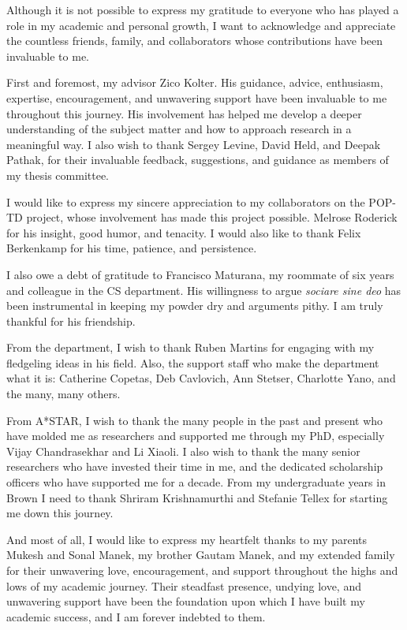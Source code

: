 \documentclass[12pt]{cmuthesis}
\begin{document}
\begin{acknowledgments}
	Although it is not possible to express my gratitude to everyone who has played a role in my academic and personal growth, I want to acknowledge and appreciate the countless friends, family, and collaborators whose contributions have been invaluable to me.

	First and foremost, my advisor Zico Kolter. His guidance, advice, enthusiasm, expertise, encouragement, and unwavering support have been invaluable to me throughout this journey. His involvement has helped me develop a deeper understanding of the subject matter and how to approach research in a meaningful way. I also wish to thank Sergey Levine, David Held, and Deepak Pathak, for their invaluable feedback, suggestions, and guidance as members of my thesis committee.

	I would like to express my sincere appreciation to my collaborators on the POP-TD project, whose involvement has made this project possible. Melrose Roderick for his insight, good humor, and tenacity. I would also like to thank Felix Berkenkamp for his time, patience, and persistence.

	I also owe a debt of gratitude to Francisco Maturana, my roommate of six years and colleague in the CS department. His willingness to argue \emph{sociare sine deo} has been instrumental in keeping my powder dry and arguments pithy. I am truly thankful for his friendship.

	From the department, I wish to thank Ruben Martins for engaging with my fledgeling ideas in his field. Also, the support staff who make the department what it is: Catherine Copetas, Deb Cavlovich, Ann Stetser, Charlotte Yano, and the many, many others.
	\clearpage

	From A*STAR, I wish to thank the many people in the past and present who have molded me as researchers and supported me through my PhD, especially Vijay Chandrasekhar and Li Xiaoli. I also wish to thank the many senior researchers who have invested their time in me, and the dedicated scholarship officers who have supported me for a decade. From my undergraduate years in Brown I need to thank Shriram Krishnamurthi and Stefanie Tellex for starting me down this journey.

	And most of all, I would like to express my heartfelt thanks to my parents Mukesh and Sonal Manek, my brother Gautam Manek, and my extended family for their unwavering love, encouragement, and support throughout the highs and lows of my academic journey. Their steadfast presence, undying love, and unwavering support have been the foundation upon which I have built my academic success, and I am forever indebted to them.
\end{acknowledgments}
\end{document}
